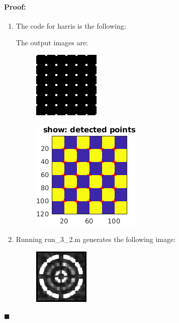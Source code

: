 \documentclass[12pt]{article}
\newenvironment{proof}{\paragraph{Proof: }}{\hfill$\blacksquare$}
\begin{document}
\begin{proof}
\begin{enumerate}

\item The code for harris is the following:



The output images are:

\begin{figure}[H]
\begin{center}
\advance\leftskip-3cm
\advance\rightskip-3cm
\includegraphics[keepaspectratio=true, scale = 1]{response_checkerboard.png}
\caption{}
\label{visina8}
\end{center}
\end{figure}

\begin{figure}[H]
\begin{center}
\advance\leftskip-3cm
\advance\rightskip-3cm
\includegraphics[keepaspectratio=true, scale = 1]{detect_checkerboard.png}
\caption{}
\label{visina8}
\end{center}
\end{figure}

\item

Running run\_3\_2.m generates the following image:

\begin{figure}[H]
\begin{center}
\advance\leftskip-3cm
\advance\rightskip-3cm
\includegraphics[keepaspectratio=true, scale = 1]{response_rings.png}
\caption{}
\label{visina8}
\end{center}
\end{figure}


\end{enumerate}
\end{proof}
\end{document}
